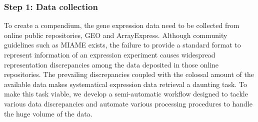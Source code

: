 \subsubsection{Step 1: Data collection}




To create a compendium, the gene expression data need to be collected from
online public repositories, GEO and ArrayExpress.
%
Although community guidelines such as MIAME \cite{Brazma2001} exists, the
failure to provide a standard format to represent information of an expression
experiment causes widespread representation discrepancies among the data
deposited in those online repositories.
%
The prevailing discrepancies coupled with the colossal amount of the available
data makes systematical expression data retrieval a daunting task.
%
To make this task viable, we develop a semi-automatic workflow designed to
tackle various data discrepancies and automate various processing procedures
to handle the huge volume of the data.


